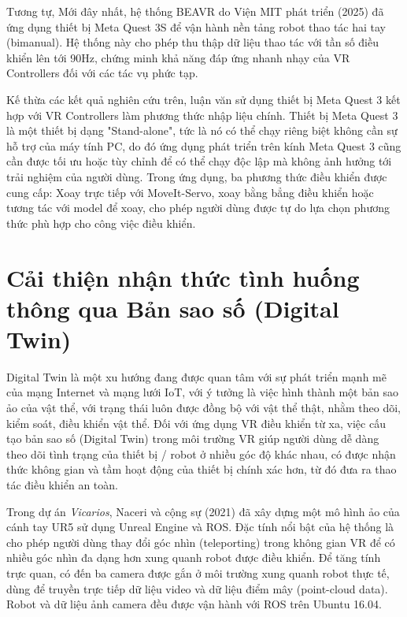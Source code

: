 Tương tự,  Mới đây nhất, hệ thống BEAVR do Viện MIT phát triển (2025) \cite{arclab2025beavr} đã ứng dụng thiết bị Meta Quest 3S để vận hành nền tảng robot thao tác hai tay (bimanual). Hệ thống này cho phép thu thập dữ liệu thao tác với tần số điều khiển lên tới 90Hz, chứng minh khả năng đáp ứng nhanh nhạy của VR Controllers đối với các tác vụ phức tạp.

Kế thừa các kết quả nghiên cứu trên, luận văn sử dụng thiết bị Meta Quest 3 kết hợp với VR Controllers làm phương thức nhập liệu chính. Thiết bị Meta Quest 3 là một thiết bị dạng "Stand-alone", tức là nó có thể chạy riêng biệt không cần sự hỗ trợ của máy tính PC, do đó ứng dụng phát triển trên kính Meta Quest 3 cũng cần được tối ưu hoặc tùy chỉnh để có thể chạy độc lập mà không ảnh hưởng tới trải nghiệm của người dùng. Trong ứng dụng, ba phương thức điều khiển được cung cấp: Xoay trực tiếp với MoveIt-Servo, xoay bằng bẳng điều khiển hoặc tương tác với model để xoay, cho phép người dùng được tự do lựa chọn phương thức phù hợp cho công việc điều khiển.

\section{Cải thiện nhận thức tình huống thông qua Bản sao số (Digital Twin)}
Digital Twin là một xu hướng đang được quan tâm với sự phát triển mạnh mẽ của mạng Internet và mạng lưới IoT, với ý tưởng là việc hình thành một bản sao ảo của vật thể, với trạng thái luôn được đồng bộ với vật thể thật, nhằm theo dõi, kiểm soát, điều khiển vật thể. Đối với ứng dụng VR điều khiển từ xa, việc cấu tạo bản sao số (Digital Twin) trong môi trường VR giúp người dùng dễ dàng theo dõi tình trạng của thiết bị / robot ở nhiều góc độ khác nhau, có được nhận thức không gian và tầm hoạt động của thiết bị chính xác hơn, từ đó đưa ra thao tác điều khiển an toàn. 

Trong dự án \textit{Vicarios}, Naceri và cộng sự (2021) \cite{naceri2021vicarios} đã xây dựng một mô hình ảo của cánh tay UR5 sử dụng Unreal Engine và ROS. Đặc tính nổi bật của hệ thống là cho phép người dùng thay đổi góc nhìn (teleporting) trong không gian VR để có nhiều góc nhìn đa dạng hơn xung quanh robot được điều khiển. Để tăng tính trực quan, có đến ba camera được gắn ở môi trường xung quanh robot thực tế, dùng để truyền trực tiếp dữ liệu video và dữ liệu điểm mây (point-cloud data). Robot và dữ liệu ảnh camera đều được vận hành với ROS trên Ubuntu 16.04.

